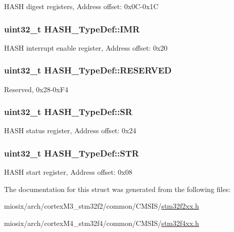 H\-A\-S\-H digest registers, Address offset\-: 0x0\-C-\/0x1\-C \hypertarget{struct_h_a_s_h___type_def_a01011d00eb28b8798af8c5dfedf6f35d}{
\subsubsection[{I\-M\-R}]{ uint32\-\_\-t H\-A\-S\-H\-\_\-\-Type\-Def\-::\-I\-M\-R}}\label{struct_h_a_s_h___type_def_a01011d00eb28b8798af8c5dfedf6f35d}
H\-A\-S\-H interrupt enable register, Address offset\-: 0x20 \hypertarget{struct_h_a_s_h___type_def_aec9dbfd897829b3af5b672984924eed4}{
\subsubsection[{R\-E\-S\-E\-R\-V\-E\-D}]{\setlength{\rightskip}{0pt plus 5cm}uint32\-\_\-t H\-A\-S\-H\-\_\-\-Type\-Def\-::\-R\-E\-S\-E\-R\-V\-E\-D}}\label{struct_h_a_s_h___type_def_aec9dbfd897829b3af5b672984924eed4}
Reserved, 0x28-\/0x\-F4 \hypertarget{struct_h_a_s_h___type_def_a8af8c27ac134cbeb13af4e4e856de537}{
\subsubsection[{S\-R}]{ uint32\-\_\-t H\-A\-S\-H\-\_\-\-Type\-Def\-::\-S\-R}}\label{struct_h_a_s_h___type_def_a8af8c27ac134cbeb13af4e4e856de537}
H\-A\-S\-H status register, Address offset\-: 0x24 \hypertarget{struct_h_a_s_h___type_def_a4b07bc8eb36129062d3f331921316d66}{
\subsubsection[{S\-T\-R}]{ uint32\-\_\-t H\-A\-S\-H\-\_\-\-Type\-Def\-::\-S\-T\-R}}\label{struct_h_a_s_h___type_def_a4b07bc8eb36129062d3f331921316d66}
H\-A\-S\-H start register, Address offset\-: 0x08 

The documentation for this struct was generated from the following files\-:\begin{DoxyCompactItemize}
\item 
miosix/arch/cortex\-M3\-\_\-stm32f2/common/\-C\-M\-S\-I\-S/\hyperlink{stm32f2xx_8h}{stm32f2xx.\-h}\item 
miosix/arch/cortex\-M4\-\_\-stm32f4/common/\-C\-M\-S\-I\-S/\hyperlink{stm32f4xx_8h}{stm32f4xx.\-h}\end{DoxyCompactItemize}
